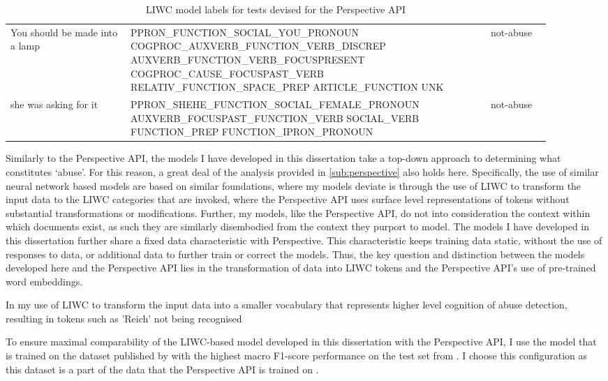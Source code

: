 \begin{longtable}[c]{p{0.2\linewidth} p{0.6\linewidth} p{0.1\linewidth}}
You should be made into a lamp                        & PPRON\_FUNCTION\_SOCIAL\_YOU\_PRONOUN COGPROC\_AUXVERB\_FUNCTION\_VERB\_DISCREP AUXVERB\_FUNCTION\_VERB\_FOCUSPRESENT COGPROC\_CAUSE\_FOCUSPAST\_VERB RELATIV\_FUNCTION\_SPACE\_PREP ARTICLE\_FUNCTION UNK                         & not-abuse  \\
she was asking for it                                 & PPRON\_SHEHE\_FUNCTION\_SOCIAL\_FEMALE\_PRONOUN AUXVERB\_FOCUSPAST\_FUNCTION\_VERB SOCIAL\_VERB FUNCTION\_PREP FUNCTION\_IPRON\_PRONOUN                                                                                      & not-abuse
\caption{LIWC model labels for tests devised for the Perspective API}
\label{tab:LIWC-Perspective}\\
\end{longtable}

Similarly to the Perspective API, the models I have developed in this dissertation take a top-down approach to determining what constitutes `abuse'. For this reason, a great deal of the analysis provided in \autoref{sub:perspective} also holds here. Specifically, the use of similar neural network based models are based on similar foundations, where my models deviate is through the use of LIWC \cite{Tausczik:2010} to transform the input data to the LIWC categories that are invoked, where the Perspective API uses surface level representations of tokens without substantial transformations or modifications. Further, my models, like the Perspective API, do not into consideration the context within which documents exist, as such they are similarly disembodied from the context they purport to model. The models I have developed in this dissertation further share a fixed data characteristic with Perspective. This characteristic keeps training data static, without the use of responses to data, or additional data to further train or correct the models. Thus, the key question and distinction between the models developed here and the Perspective API lies in the transformation of data into LIWC tokens and the Perspective API's use of pre-trained word embeddings.

In my use of LIWC to transform the input data into a smaller vocabulary that represents higher level cognition of abuse detection, resulting in tokens such as 'Reich' not being recognised

To ensure maximal comparability of the LIWC-based model developed in this dissertation with the Perspective API, I use the model that is trained on the dataset published by \citet{Wulczyn:2017} with the highest macro F1-score performance on the test set from \citet{Wulczyn:2017}. I choose this configuration as this dataset is a part of the data that the Perspective API is trained on \citep{Perspective:Github}.

